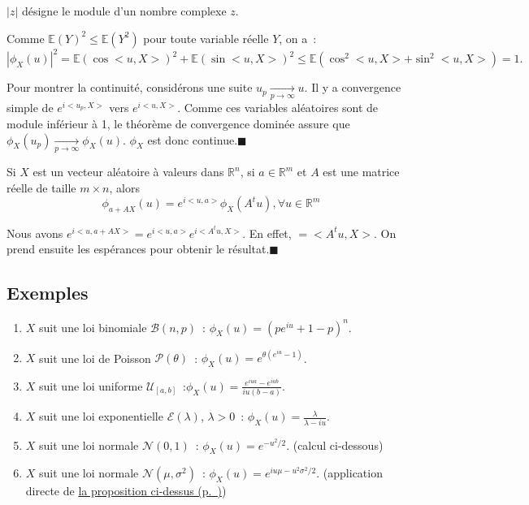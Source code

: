 \begin{preuve}
\(|z|\) désigne le module d'un nombre complexe \(z\).

Comme \(\mathbb{E}(Y)^2 \leq \mathbb{E}(Y^2)\) pour toute variable
réelle \(Y\), on a~:
\[ |\phi_X(u)|^2 = \mathbb{E}(\cos< u, X>)^2 + \mathbb{E}(\sin< u, X>)^2 \leq \mathbb{E}(\cos^2< u, X> + \sin^2< u, X>) = 1.\]

Pour montrer la continuité, considérons une suite
\(u_p \xrightarrow[p \to \infty]{} u\). Il y a convergence simple de
\(e^{i < u_p,X>}\) vers \(e^{i < u,X>}\). Comme ces variables aléatoires
sont de module inférieur à 1, le théorème de convergence dominée assure
que \(\phi_X(u_p) \xrightarrow[p \to \infty]{} \phi_X(u)\). \(\phi_X\)
est donc continue.\hfill$\blacksquare$
\end{preuve}

\begin{proposition}\label{IV-fct_carac_vec}

Si \(X\) est un vecteur aléatoire à valeurs dans \(\mathbb{R}^n\), si
\(a \in \mathbb{R}^m\) et \(A\) est une matrice réelle de taille
\(m \times n\), alors
\[ \phi_{a+AX}(u) = e^{i < u,a>} \phi_X (A^t u), \forall u \in \mathbb{R}^m\]
\end{proposition}

\begin{preuve}
Nous avons \(e^{i< u, a + AX>} = e^{i < u,a>}e^{i <A^tu, X>}\). En
effet, \(< u, A X> = < A^t u, X>\). On prend ensuite les espérances pour
obtenir le résultat.\hfill$\blacksquare$
\end{preuve}

\subsection*{Exemples}\label{IV-ex}
\begin{enumerate}
\def\labelenumi{\arabic{enumi}.}
\tightlist
\item
  \(X\) suit une loi binomiale \(\mathcal{B}(n,p)\)~:
  \(\phi_X(u) = (p e^{iu}+ 1- p)^n\).
\item
  \(X\) suit une loi de Poisson \(\mathcal{P}(\theta)\)~:
  \(\phi_X(u) = e^{\theta (e^{iu}-1)}\).
\item
  \(X\) suit une loi uniforme
  \(\mathcal{U}_{[a,b]}\)~:\(\phi_X(u) = \frac{e^{iua} - e^{iub}}{iu(b-a)}\).
\item
  \(X\) suit une loi exponentielle \(\mathcal{E}(\lambda)\),
  \(\lambda > 0\)~: \(\phi_X(u) = \frac{\lambda}{\lambda - iu}\).
\item
  \(X\) suit une loi normale \(\mathcal{N}(0,1)\)~:
  \(\phi_X(u) = e^{-u^2/2}\). (calcul ci-dessous)
\item
  \(X\) suit une loi normale \(\mathcal{N}(\mu,\sigma^2)\)~:
  \(\phi_X(u) = e^{iu\mu -u^2\sigma^2/2}\). (application directe de
  \protect\hyperref[IV-fct_carac_vec]{la proposition
  ci-dessus (p.~\pageref*{IV-fct_carac_vec})})
\end{enumerate}


